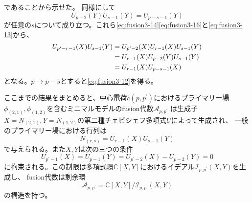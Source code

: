 \documentclass[11pt, aps, longbibliography]{article}
\numberwithin{equation}{section}
\begin{document}
        であることから示せた。
        同様にして
        \begin{equation}\label{eq:fusion3-16}
            U_{p-2}(Y)U_{s-1}(Y) = U_{p-s-1}(Y)
        \end{equation}
        が任意の$s$について成り立つ。これら\eqref{eq:fusion3-14}\eqref{eq:fusion3-16}と\eqref{eq:fusion3-13}から、
        \begin{align}\label{eq:fusion3-17}
            U_{p^\prime-r-1}(X)U_{s-1}(Y) &= U_{p^\prime-2}(X)U_{r-1}(X)U_{s-1}(Y) \notag \\
            &= U_{r-1}(X)U_{p-2}(Y)U_{s-1}(Y) \notag \\
            &= U_{r-1}(X)U_{p-s-1}(X)
        \end{align}
        となる。$p\rightarrow p-s$とすると\eqref{eq:fusion3-12}を得る。

        ここまでの結果をまとめると、中心電荷$c(p,p^\prime)$におけるプライマリー場$\phi_{(2,1)},\phi_{(1,2)}$を含むミニマルモデルのfusion代数$\mathcal{A}_{p,p^\prime}$
        は生成子$X=N_{(2,1)},Y=N_{(1,2)}$の第二種チェビシェフ多項式$U$によって生成され、
        一般のプライマリー場における行列は
        \begin{equation}\label{eq:fusion3-18}
            N_{(r,s)} = U_{r-1}(X)U_{s-1}(Y)
        \end{equation}
        で与えられる。また$X,Y$は次の三つの条件
        \begin{equation}\label{eq:fusion3-19}
            U_{p^\prime-1}(X) = U_{p-1}(Y) = U_{p^\prime-2}(X) - U_{p-2}(Y)=0
        \end{equation}
        に拘束される。この制限は多項式環$\mathbb{C}[X,Y]$におけるイデアル$\mathcal{I}_{p,p^\prime}(X,Y)$を生成し、
        fusion代数は剰余環
        \begin{equation}\label{eq:fusion3-20}
            \mathcal{A}_{p,p^\prime} = \mathbb{C}[X,Y]/\mathcal{I}_{p,p^\prime}(X,Y)
        \end{equation}
        の構造を持つ。
        
\end{document}
